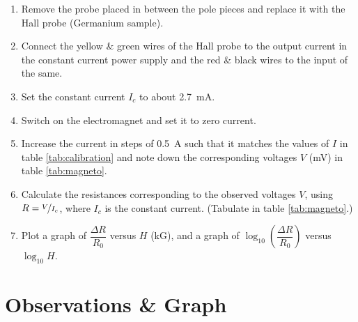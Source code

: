 \begin{enumerate}
	\item 	Remove the probe placed in between the pole pieces and replace it with the Hall probe (Germanium sample). 
	
	\item	Connect the yellow \& green wires of the Hall probe to the output current in the constant current power supply and the red \& black wires to the input of the same. 
	
	\item 	Set the constant current $ I_c $ to about \SI{2.7}{\milli\ampere}.
	
	\item 	Switch on the electromagnet and set it to zero current.
	
	\item 	Increase the current in steps of \SI{0.5}{\ampere} such that it matches the values of $ I $ in table \ref{tab:calibration} and note down the corresponding voltages $ V $ (\si{\milli\volt}) in table \ref{tab:magneto}.
	
	\item 	Calculate the resistances corresponding to the observed voltages $ V $, using $ R = \nicefrac{V}{I_c} $, where $ I_c $ is the constant current. (Tabulate in table \ref{tab:magneto}.)
	
	\item 	Plot a graph of $ \dfrac{\Delta R}{R_0} $ versus $ H $ (kG), and a graph of $ \log_{10}\left(\dfrac{\Delta R}{R_0}\right) $ versus $ \log_{10} H $.
\end{enumerate}

\section{Observations \& Graph}

